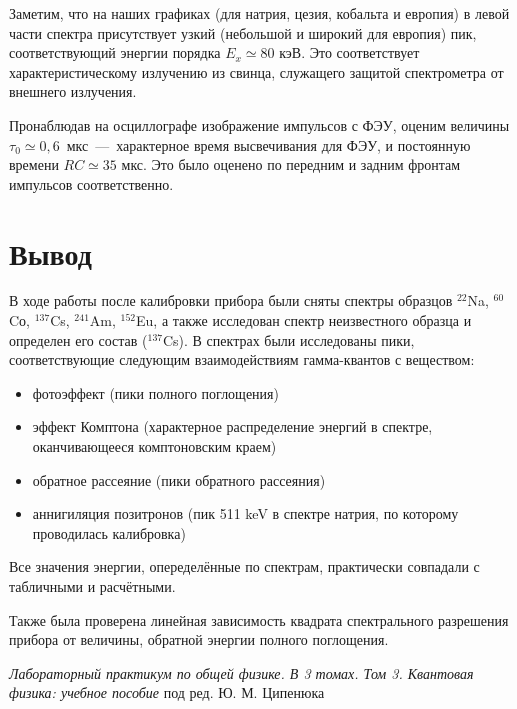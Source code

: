 \documentclass[12pt,a4paper]{article}
\begin{document}
Заметим, что на наших графиках (для натрия, цезия, кобальта и европия) в левой части спектра присутствует узкий (небольшой и широкий для европия) пик, соответствующий энергии порядка $ E_x \simeq 80 $ кэВ. Это соответствует характеристическому излучению из свинца, служащего защитой спектрометра от внешнего излучения. 

Пронаблюдав на осциллографе изображение импульсов с ФЭУ, оценим величины $ \tau_0 \simeq 0,6 $~мкс~---~характерное время высвечивания для ФЭУ, и постоянную времени $ RC \simeq 35 $ мкс. Это было оценено по передним и задним фронтам импульсов соответственно. 


\clearpage
    
\section*{Вывод}

В ходе работы после калибровки прибора были сняты спектры образцов $^{22}$Na,  $^{60}$Cо,  $^{137}$Cs, $^{241}$Am, $^{152}$Eu, а также исследован спектр неизвестного образца и определен его состав ($^{137}$Cs). В спектрах были исследованы пики, соответствующие следующим взаимодействиям гамма-квантов с веществом:

\begin{itemize}
    \item фотоэффект (пики полного поглощения)
    \item эффект Комптона (характерное распределение энергий в спектре, оканчивающееся комптоновским краем)
    \item обратное рассеяние (пики обратного рассеяния)
    \item аннигиляция позитронов (пик 511 keV в спектре натрия, по которому проводилась калибровка)
\end{itemize}

Все значения энергии, опеределённые по спектрам, практически совпадали с табличными и расчётными. \par

Также была проверена линейная зависимость квадрата спектрального разрешения прибора от величины, обратной энергии полного поглощения.

\vfill
    
\begin{thebibliography}{9}
	 \emph{Лабораторный практикум по общей физике. В 3 томах. Том 3. Квантовая физика: учебное пособие} под ред. Ю. М. Ципенюка
\end{thebibliography}
\end{document}
